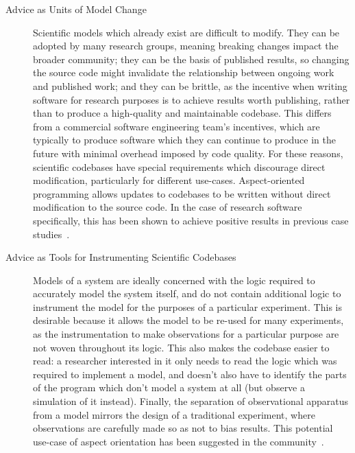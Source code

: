 \begin{description}
  \item[Advice as Units of Model Change] Scientific models which already exist
    are difficult to modify. They can be adopted by many research groups,
    meaning breaking changes impact the broader community; they can be the basis
    of published results, so changing the source code might invalidate the
    relationship between ongoing work and published work; and they can be
    brittle, as the incentive when writing software for research purposes is to
    achieve results worth publishing, rather than to produce a high-quality and
    maintainable codebase. This differs from a commercial software engineering
    team's incentives, which are typically to produce software which they can
    continue to produce in the future with minimal overhead imposed by code
    quality. For these reasons, scientific codebases have special requirements
    which discourage direct modification, particularly for different use-cases.
    Aspect-oriented programming allows updates to codebases to be written
    without direct modification to the source code. In the case of research
    software specifically, this has been shown to achieve positive results in
    previous case studies~\cite{ionescu2009aspect}.

  \item[Advice as Tools for Instrumenting Scientific Codebases]
    Models of a system are ideally concerned with the logic required to
    accurately model the system itself, and do not contain additional logic to
    instrument the model for the purposes of a particular experiment. This is
    desirable because it allows the model to be re-used for many experiments, as
    the instrumentation to make observations for a particular purpose are not
    woven throughout its logic. This also makes the codebase easier to read: a
    researcher interested in it only needs to read the logic which was required
    to implement a model, and doesn't also have to identify the parts of the
    program which don't model a system at all (but observe a simulation of it
    instead). Finally, the separation of observational apparatus from a model
    mirrors the design of a traditional experiment, where observations are
    carefully made so as not to bias results. This potential use-case of aspect
    orientation has been suggested in the community~\cite{gulyas1999use}.


\end{description}
